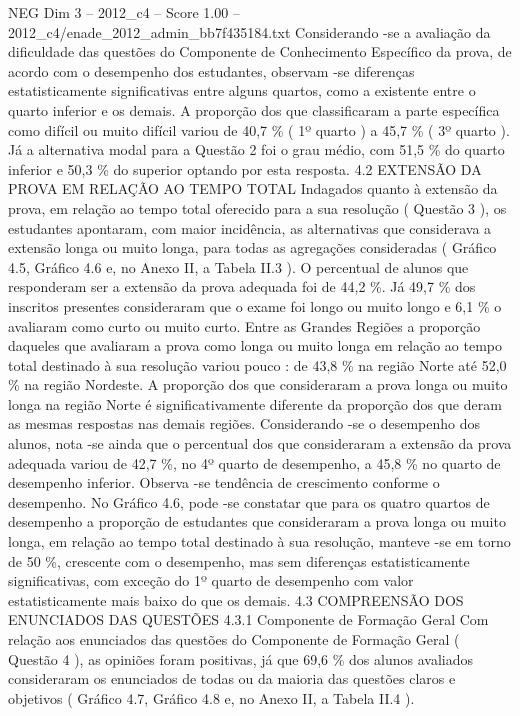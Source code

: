 \begin{textsample}{NEG Dim 3 – 2012\_c4 – Score 1.00 – 2012\_c4/enade\_2012\_admin\_bb7f435184.txt}
Considerando -se a avaliação da dificuldade das questões do Componente de Conhecimento Específico da prova, de acordo com o desempenho dos estudantes, observam -se diferenças estatisticamente significativas entre alguns quartos, como a existente entre o quarto inferior e os demais.
A proporção dos que classificaram a parte específica como difícil ou muito difícil variou de 40,7 \% ( 1º quarto ) a 45,7 \% ( 3º quarto ).
Já a alternativa modal para a Questão 2 foi o grau médio, com 51,5 \% do quarto inferior e 50,3 \% do superior optando por esta resposta. 4.2 EXTENSÃO DA PROVA EM RELAÇÃO AO TEMPO TOTAL Indagados quanto à extensão da prova, em relação ao tempo total oferecido para a sua resolução ( Questão 3 ), os estudantes apontaram, com maior incidência, as alternativas que considerava a extensão longa ou muito longa, para todas as agregações consideradas ( Gráfico 4.5, Gráfico 4.6 e, no Anexo II, a Tabela II.3 ).
O percentual de alunos que responderam ser a extensão da prova adequada foi de 44,2 \%.
Já 49,7 \% dos inscritos presentes consideraram que o exame foi longo ou muito longo e 6,1 \% o avaliaram como curto ou muito curto.
Entre as Grandes Regiões a proporção daqueles que avaliaram a prova como longa ou muito longa em relação ao tempo total destinado à sua resolução variou pouco : de 43,8 \% na região Norte até 52,0 \% na região Nordeste.
A proporção dos que consideraram a prova longa ou muito longa na região Norte é significativamente diferente da proporção dos que deram as mesmas respostas nas demais regiões.
Considerando -se o desempenho dos alunos, nota -se ainda que o percentual dos que consideraram a extensão da prova adequada variou de 42,7 \%, no 4º quarto de desempenho, a 45,8 \% no quarto de desempenho inferior.
Observa -se tendência de crescimento conforme o desempenho.
No Gráfico 4.6, pode -se constatar que para os quatro quartos de desempenho a proporção de estudantes que consideraram a prova longa ou muito longa, em relação ao tempo total destinado à sua resolução, manteve -se em torno de 50 \%, crescente com o desempenho, mas sem diferenças estatisticamente significativas, com exceção do 1º quarto de desempenho com valor estatisticamente mais baixo do que os demais. 4.3 COMPREENSÃO DOS ENUNCIADOS DAS QUESTÕES 4.3.1 Componente de Formação Geral Com relação aos enunciados das questões do Componente de Formação Geral ( Questão 4 ), as opiniões foram positivas, já que 69,6 \% dos alunos avaliados consideraram os enunciados de todas ou da maioria das questões claros e objetivos ( Gráfico 4.7, Gráfico 4.8 e, no Anexo II, a Tabela II.4 ).

\end{textsample}
